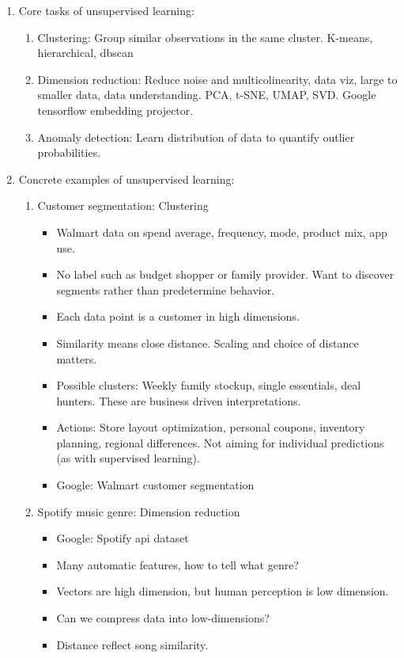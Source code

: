 \documentclass{article}
\begin{document}
\begin{enumerate}
\item Core tasks of unsupervised learning:
\begin{enumerate}
\item Clustering: Group similar observations in the same cluster. K-means, hierarchical, dbscan
\item Dimension reduction: Reduce noise and multicolinearity, data viz, large to smaller data, data understanding. PCA, t-SNE, UMAP, SVD. Google tensorflow embedding projector.
\item Anomaly detection: Learn distribution of data to quantify outlier probabilities.
\end{enumerate}

\item Concrete examples of unsupervised learning:
\begin{enumerate}
\item Customer segmentation: Clustering
\begin{itemize}
\item Walmart data on spend average, frequency, mode, product mix, app use. 
\item No label such as budget shopper or family provider. Want to discover segments rather than predetermine behavior.
\item Each data point is a customer in high dimensions. 
\item Similarity means close distance. Scaling and choice of distance matters.
\item Possible clusters: Weekly family stockup, single essentials, deal hunters. These are business driven interpretations.
\item Actions: Store layout optimization, personal coupons, inventory planning, regional differences. Not aiming for individual predictions (as with supervised learning).
\item Google: Walmart customer segmentation
\end{itemize}
\item Spotify music genre: Dimension reduction
\begin{itemize}
\item Google: Spotify api dataset
\item Many automatic features, how to tell what genre?
\item Vectors are high dimension, but human perception is low dimension.
\item Can we compress data into low-dimensions?
\item Distance reflect song similarity.

\end{itemize}
\end{enumerate}
\end{enumerate}
\end{document}
